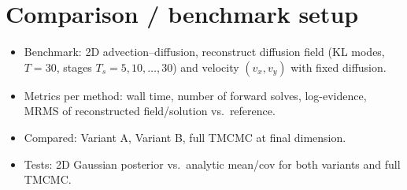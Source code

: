 \documentclass[11pt,a4paper]{article}
\begin{document}
\section{Comparison / benchmark setup}
\begin{itemize}
  \item Benchmark: 2D advection--diffusion, reconstruct diffusion field (KL modes, $T = 30$, stages $T_s = 5,10,\dots,30$) and velocity $(v_x, v_y)$ with fixed diffusion.
  \item Metrics per method: wall time, number of forward solves, log-evidence, MRMS of reconstructed field/solution vs.\ reference.
  \item Compared: Variant A, Variant B, full TMCMC at final dimension.
  \item Tests: 2D Gaussian posterior vs.\ analytic mean/cov for both variants and full TMCMC.
\end{itemize}



\end{document}
